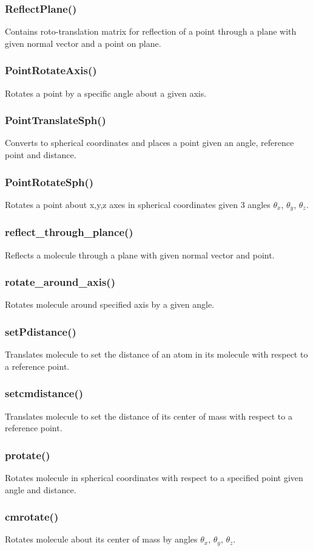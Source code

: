 \documentclass[a4paper,12pt]{assignment}
\begin{document}
\subsubsection{ReflectPlane()}
Contains roto-translation matrix for reflection of a point through a plane with given normal vector and a point on plane.
\subsubsection{PointRotateAxis()} 
Rotates a point by a specific angle about a given axis.
\subsubsection{PointTranslateSph()}
Converts to spherical coordinates and places a point given an angle, reference point and distance.
\subsubsection{PointRotateSph()} 
Rotates a point about x,y,z axes in spherical coordinates given 3 angles $\theta_x$, $\theta_y$, $\theta_z$. 
\subsubsection{reflect\_through\_plance()} 
Reflects a molecule through a plane with given normal vector and point.
\subsubsection{rotate\_around\_axis()} 
Rotates molecule around specified axis by a given angle.
\subsubsection{setPdistance()} 
Translates molecule to set the distance of an atom in its molecule with respect to a reference point.
\subsubsection{setcmdistance()} 
Translates molecule to set the distance of its center of mass with respect to a reference point.
\subsubsection{protate()} 
Rotates molecule in spherical coordinates with respect to a specified point given angle and distance.
\subsubsection{cmrotate()}
Rotates molecule about its center of mass by angles $\theta_x$, $\theta_y$, $\theta_z$.
\end{document}

